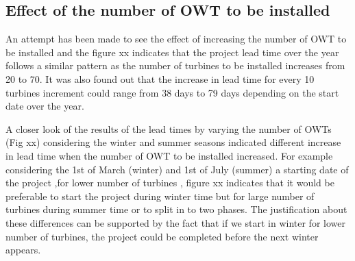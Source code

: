 \subsection{Effect of the number of OWT to be installed}

An attempt has been made to see the effect of increasing the number of OWT to be installed and the figure xx indicates that the project lead time over the year follows a similar pattern as the number of turbines to be installed increases from 20 to 70. It was also found out that the increase in lead time for every 10 turbines increment could range from 38 days to 79 days depending on the start date over the year.  

A closer look of the results of the lead times by varying the number of OWTs (Fig xx) considering the winter and summer seasons indicated different increase in lead time when the number of OWT to be installed increased. For example considering the 1st of March (winter) and 1st of July (summer) a starting date of the project ,for lower number of turbines , figure xx indicates that it would be preferable to start the project during winter time but for large number of turbines during summer time or to split in to two phases. The justification about these differences can be supported by the fact that if we start in winter for lower number of turbines, the project could be completed before the next winter appears. 